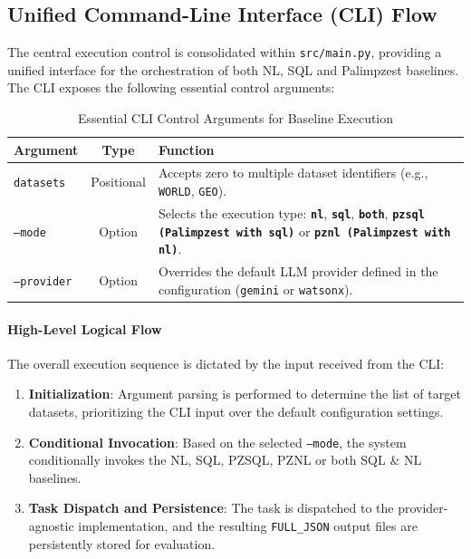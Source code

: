 \subsection{Unified Command-Line Interface (CLI) Flow}

The central execution control is consolidated within \texttt{src/main.py}, providing a unified interface for the orchestration of both NL, SQL and Palimpzest baselines. The CLI exposes the following essential control arguments:

\begin{table}[h]
    \centering
    \label{tab:cli-arguments}
    \begin{tabular}{l c p{11cm}} 
        \toprule
        \textbf{Argument} & \textbf{Type} & \textbf{Function} \\
        \midrule
        \texttt{datasets} & Positional & Accepts zero to multiple dataset identifiers (e.g., \texttt{WORLD}, \texttt{GEO}). \\
        \texttt{--mode} & Option & Selects the execution type: \textbf{\texttt{nl}}, \textbf{\texttt{sql}}, \textbf{\texttt{both}}, \textbf{\texttt{pzsql (Palimpzest with sql)}} or \textbf{\texttt{pznl (Palimpzest with nl)}}. \\
        \texttt{--provider} & Option & Overrides the default LLM provider defined in the configuration (\texttt{gemini} or \texttt{watsonx}). \\
        \bottomrule
    \end{tabular}
    \caption{Essential CLI Control Arguments for Baseline Execution}
\end{table}
\paragraph{\textbf{High-Level Logical Flow}}
The overall execution sequence is dictated by the input received from the CLI:
\begin{enumerate}[leftmargin=*, label=\arabic*.]
    \item \textbf{Initialization}: Argument parsing is performed to determine the list of target datasets, prioritizing the CLI input over the default configuration settings.
    \item \textbf{Conditional Invocation}: Based on the selected \texttt{--mode}, the system conditionally invokes the NL, SQL, PZSQL, PZNL or both SQL \& NL baselines.
    \item \textbf{Task Dispatch and Persistence}: The task is dispatched to the provider-agnostic implementation, and the resulting \texttt{FULL\_JSON} output files are persistently stored for evaluation.
\end{enumerate}